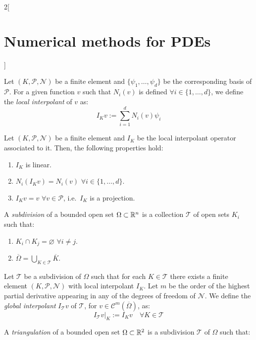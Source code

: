 \documentclass[../../../main_math.tex]{subfiles}
\begin{document}
\begin{multicols}{2}[\section{Numerical methods for PDEs}]
\begin{remark}
\begin{enumerate}
    \end{enumerate}
  \end{remark}
  \begin{definition}
    Let $(K,\mathcal{P},\mathcal{N})$ be a finite element and $\{\psi_1,\ldots,\psi_d\}$ be the corresponding basis of $\mathcal{P}$. For a given function $v$ such that $N_i(v)$ is defined $\forall i\in\{1,\ldots,d\}$, we define the \emph{local interpolant} of $v$ as:
    $$
      I_Kv:=\sum_{i=1}^d N_i(v)\psi_i
    $$
  \end{definition}
  \begin{lemma}
    Let $(K,\mathcal{P},\mathcal{N})$ be a finite element and $I_K$ be the local interpolant operator associated to it. Then, the following properties hold:
    \begin{enumerate}
      \item $I_K$ is linear.
      \item $N_i(I_Kv)=N_i(v)$ $\forall i\in\{1,\ldots,d\}$.
      \item $I_Kv=v$ $\forall v\in \mathcal{P}$, i.e.\ $I_K$ is a projection.
    \end{enumerate}
  \end{lemma}
  \begin{definition}
    A \emph{subdivision} of a bounded open set $\Omega\subset \mathbb{R}^n$ is a collection $\mathcal{T}$ of open sets $K_i$ such that:
    \begin{enumerate}
      \item $K_i\cap K_j=\varnothing$ $\forall i\neq j$.
      \item $\overline{\Omega}= \bigcup_{K\in\mathcal{T}}\overline{K}$.
    \end{enumerate}
  \end{definition}
  \begin{definition}
    Let $\mathcal{T}$ be a subdivision of $\Omega$ such that for each $K\in\mathcal{T}$ there exists a finite element $(K,\mathcal{P},\mathcal{N})$ with local interpolant $I_K$. Let $m$ be the order of the highest partial derivative appearing in any of the degrees of freedom of $\mathcal{N}$. We define the \emph{global interpolant} $I_\mathcal{T}v$ of $\mathcal{T}$, for $v\in \mathcal{C}^m(\overline{\Omega})$, as:
    $$
      I_\mathcal{T}v|_K:=I_Kv\quad \forall K\in\mathcal{T}
    $$
  \end{definition}
  \begin{definition}
    A \emph{triangulation} of a bounded open set $\Omega\subset \mathbb{R}^2$ is a subdivision $\mathcal{T}$ of $\Omega$ such that:

\end{definition}
\end{multicols}
\end{document}
